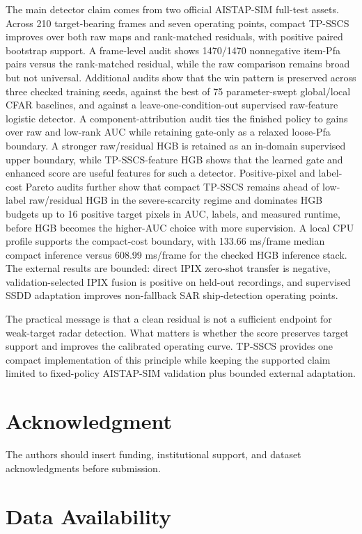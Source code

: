 \documentclass[journal]{IEEEtran}
\begin{document}
The main detector claim comes from two official AISTAP-SIM full-test assets. Across 210 target-bearing frames and seven operating points, compact TP-SSCS improves over both raw maps and rank-matched residuals, with positive paired bootstrap support. A frame-level audit shows 1470/1470 nonnegative item-Pfa pairs versus the rank-matched residual, while the raw comparison remains broad but not universal. Additional audits show that the win pattern is preserved across three checked training seeds, against the best of 75 parameter-swept global/local CFAR baselines, and against a leave-one-condition-out supervised raw-feature logistic detector. A component-attribution audit ties the finished policy to gains over raw and low-rank AUC while retaining gate-only as a relaxed loose-Pfa boundary. A stronger raw/residual HGB is retained as an in-domain supervised upper boundary, while TP-SSCS-feature HGB shows that the learned gate and enhanced score are useful features for such a detector. Positive-pixel and label-cost Pareto audits further show that compact TP-SSCS remains ahead of low-label raw/residual HGB in the severe-scarcity regime and dominates HGB budgets up to 16 positive target pixels in AUC, labels, and measured runtime, before HGB becomes the higher-AUC choice with more supervision. A local CPU profile supports the compact-cost boundary, with 133.66 ms/frame median compact inference versus 608.99 ms/frame for the checked HGB inference stack. The external results are bounded: direct IPIX zero-shot transfer is negative, validation-selected IPIX fusion is positive on held-out recordings, and supervised SSDD adaptation improves non-fallback SAR ship-detection operating points.

The practical message is that a clean residual is not a sufficient endpoint for weak-target radar detection. What matters is whether the score preserves target support and improves the calibrated operating curve. TP-SSCS provides one compact implementation of this principle while keeping the supported claim limited to fixed-policy AISTAP-SIM validation plus bounded external adaptation.

\section*{Acknowledgment}

The authors should insert funding, institutional support, and dataset acknowledgments before submission.

\section*{Data Availability}
\end{document}
